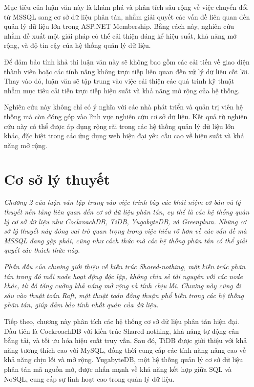 \documentclass[50pt]{extarticle}
\begin{document}
Mục tiêu của luận văn này là khám phá và phân tích sâu rộng về việc chuyển đổi từ MSSQL sang cơ sở dữ liệu phân tán, nhằm giải quyết các vấn đề liên quan đến quản lý dữ liệu lớn trong ASP.NET Membership. Bằng cách này, nghiên cứu nhằm đề xuất một giải pháp có thể cải thiện đáng kể hiệu suất, khả năng mở rộng, và độ tin cậy của hệ thống quản lý dữ liệu.

Để đảm bảo tính khả thi luận văn này sẽ không bao gồm các cải tiến về giao diện thành viên hoặc các tính năng không trực tiếp liên quan đến xử lý dữ liệu cốt lõi. Thay vào đó, luận văn sẽ tập trung vào việc cải thiện các quá trình kỹ thuật nhằm mục tiêu cải tiến trực tiếp hiệu suất và khả năng mở rộng của hệ thống.


Nghiên cứu này không chỉ có ý nghĩa với các nhà phát triển và quản trị viên hệ thống mà còn đóng góp vào lĩnh vực nghiên cứu cơ sở dữ liệu. Kết quả từ nghiên cứu này có thể được áp dụng rộng rãi trong các hệ thống quản lý dữ liệu lớn khác, đặc biệt trong các ứng dụng web hiện đại yêu cầu cao về hiệu suất và khả năng mở rộng.

\section{Cơ sở lý thuyết}


\textit{Chương 2 của luận văn tập trung vào việc trình bày các khái niệm cơ bản và lý thuyết nền tảng liên quan đến cơ sở dữ liệu phân tán, cụ thể là các hệ thống quản lý cơ sở dữ liệu như CockroachDB, TiDB, YugabyteDB, và Greenplum. Những cơ sở lý thuyết này đóng vai trò quan trọng trong việc hiểu rõ hơn về các vấn đề mà MSSQL đang gặp phải, cũng như cách thức mà các hệ thống phân tán có thể giải quyết các thách thức này.}

\textit{Phần đầu của chương giới thiệu về kiến trúc Shared-nothing, một kiến trúc phân tán trong đó mỗi node hoạt động độc lập, không chia sẻ tài nguyên với các node khác, từ đó tăng cường khả năng mở rộng và tính chịu lỗi. Chương này cũng đi sâu vào thuật toán Raft, một thuật toán đồng thuận phổ biến trong các hệ thống phân tán, giúp đảm bảo tính nhất quán của dữ liệu.}

Tiếp theo, chương này phân tích các hệ thống cơ sở dữ liệu phân tán hiện đại. Đầu tiên là CockroachDB với kiến trúc Shared-nothing, khả năng tự động cân bằng tải, và tối ưu hóa hiệu suất truy vấn. Sau đó, TiDB được giới thiệu với khả năng tương thích cao với MySQL, đồng thời cung cấp các tính năng nâng cao về khả năng chịu lỗi và mở rộng. YugabyteDB, một hệ thống quản lý cơ sở dữ liệu phân tán mã nguồn mở, được nhấn mạnh về khả năng kết hợp giữa SQL và NoSQL, cung cấp sự linh hoạt cao trong quản lý dữ liệu.
\end{document}
